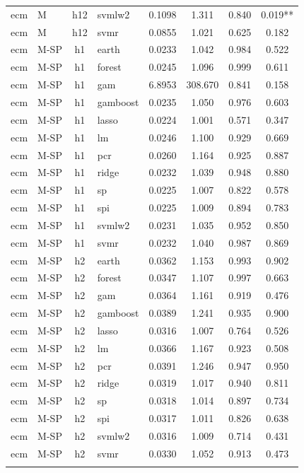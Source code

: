 \begin{ThreePartTable}
\begin{longtable}[t]{llclcccc}
ecm & M & h12 & svmlw2 & 0.1098 & 1.311 & 0.840 & 0.019**\\
ecm & M & h12 & svmr & 0.0855 & 1.021 & 0.625 & 0.182\\
\addlinespace
ecm & M-SP & h1 & earth & 0.0233 & 1.042 & 0.984 & 0.522\\
ecm & M-SP & h1 & forest & 0.0245 & 1.096 & 0.999 & 0.611\\
ecm & M-SP & h1 & gam & 6.8953 & 308.670 & 0.841 & 0.158\\
ecm & M-SP & h1 & gamboost & 0.0235 & 1.050 & 0.976 & 0.603\\
ecm & M-SP & h1 & lasso & 0.0224 & 1.001 & 0.571 & 0.347\\
ecm & M-SP & h1 & lm & 0.0246 & 1.100 & 0.929 & 0.669\\
ecm & M-SP & h1 & pcr & 0.0260 & 1.164 & 0.925 & 0.887\\
ecm & M-SP & h1 & ridge & 0.0232 & 1.039 & 0.948 & 0.880\\
ecm & M-SP & h1 & sp & 0.0225 & 1.007 & 0.822 & 0.578\\
ecm & M-SP & h1 & spi & 0.0225 & 1.009 & 0.894 & 0.783\\
ecm & M-SP & h1 & svmlw2 & 0.0231 & 1.035 & 0.952 & 0.850\\
ecm & M-SP & h1 & svmr & 0.0232 & 1.040 & 0.987 & 0.869\\
\addlinespace
ecm & M-SP & h2 & earth & 0.0362 & 1.153 & 0.993 & 0.902\\
ecm & M-SP & h2 & forest & 0.0347 & 1.107 & 0.997 & 0.663\\
ecm & M-SP & h2 & gam & 0.0364 & 1.161 & 0.919 & 0.476\\
ecm & M-SP & h2 & gamboost & 0.0389 & 1.241 & 0.935 & 0.900\\
ecm & M-SP & h2 & lasso & 0.0316 & 1.007 & 0.764 & 0.526\\
ecm & M-SP & h2 & lm & 0.0366 & 1.167 & 0.923 & 0.508\\
ecm & M-SP & h2 & pcr & 0.0391 & 1.246 & 0.947 & 0.950\\
ecm & M-SP & h2 & ridge & 0.0319 & 1.017 & 0.940 & 0.811\\
ecm & M-SP & h2 & sp & 0.0318 & 1.014 & 0.897 & 0.734\\
ecm & M-SP & h2 & spi & 0.0317 & 1.011 & 0.826 & 0.638\\
ecm & M-SP & h2 & svmlw2 & 0.0316 & 1.009 & 0.714 & 0.431\\
ecm & M-SP & h2 & svmr & 0.0330 & 1.052 & 0.913 & 0.473\\
\addlinespace

\end{longtable}
\end{ThreePartTable}
